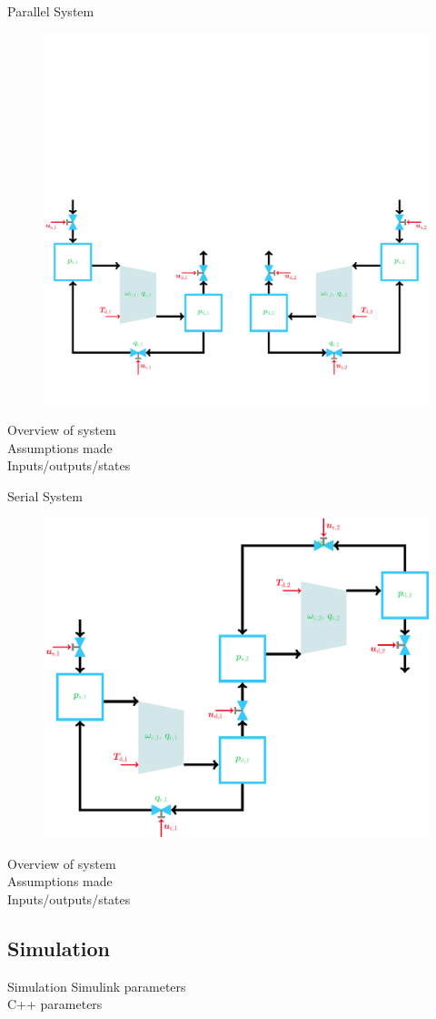 \begin{frame}{Parallel System}
  \begin{figure}[H]
    \centering
    \includegraphics[width=.8\linewidth,trim={0 0 0 5cm},clip]{figures/parallelcompressor.pdf}
  \end{figure}
  Overview of system\\
  Assumptions made\\
  Inputs/outputs/states
\end{frame}

\begin{frame}{Serial System}
  \begin{figure}[H]
    \centering
    \includegraphics[width=.5\linewidth]{figures/serialcompressor.pdf}
  \end{figure}
  Overview of system\\
  Assumptions made\\
  Inputs/outputs/states
\end{frame}

\subsection{Simulation}
\begin{frame}{Simulation}
  Simulink parameters\\
  C++ parameters
\end{frame}


